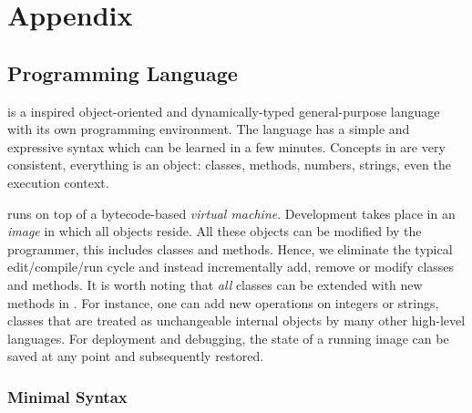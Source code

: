 
\chapter{Appendix}
\label{appendixa}


\vspace*{5cm}
\section{\PH Programming Language}


\PH is a \ST inspired object-oriented and dynamically-typed general-purpose language with its own programming environment.
The language has a simple and expressive syntax which can be learned in a few minutes.
Concepts in \PH are very consistent, everything is an object: classes, methods, numbers, strings, even the execution context.

\PH runs on top of a bytecode-based \emph{virtual machine}.
Development takes place in an \emph{image} in which all objects reside.
All these objects can be modified by the programmer, this includes classes and methods.
Hence, we eliminate the typical edit/compile/run cycle and instead incrementally add, remove or modify classes and methods.
It is worth noting that \emph{all} classes can be extended with new methods in \PH.
For instance, one can add new operations on integers or strings, classes that are treated as unchangeable internal objects by many other high-level languages.
For deployment and debugging, the state of a running image can be saved at any point and subsequently restored.

\newpage

\subsection{Minimal Syntax}

